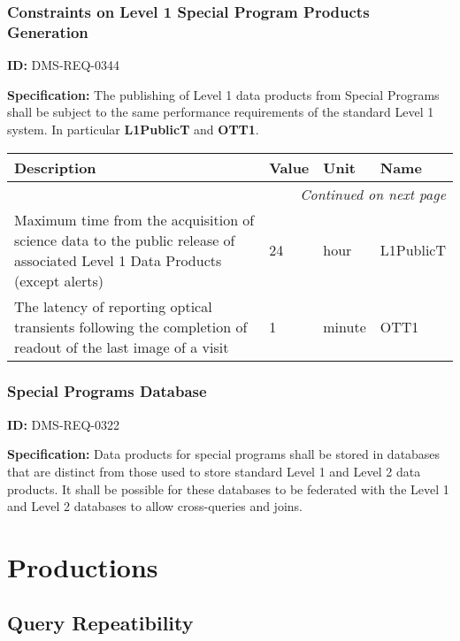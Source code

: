 \documentclass[SE,toc,lsstdraft]{lsstdoc}
\makeatletter
\newcommand{\paramname}[1]{\hspace{0pt}#1}
\newcommand{\unitname}[1]{\hspace{0pt}#1}
\newenvironment{parameters}[0]{%
\setlength\LTleft{0pt}
\setlength\LTright{\fill}
\begin{small}
\begin{longtable}[]{|p{0.5\textwidth}|l|p{0.6in}|p{1.74in}@{}|}

\hline \textbf{Description} & \textbf{Value} & \textbf{Unit} & \textbf{Name} \\ \hline
\endhead

\hline \multicolumn{4}{r}{\emph{Continued on next page}} \\
\endfoot

\hline\hline
\endlastfoot
}{%
\hline
\end{longtable}
\end{small}
}
\makeatother
\begin{document}
\subsubsection{Constraints on Level 1 Special Program Products Generation}

\label{DMS-REQ-0344}
\textbf{ID:} DMS-REQ-0344

\textbf{Specification: }The publishing of Level 1 data products from Special Programs shall be subject to the same performance requirements of the standard Level 1 system. In particular \textbf{L1PublicT} and \textbf{OTT1}.





\begin{parameters}
Maximum time from the acquisition of science data to the public release of associated Level 1 Data Products (except alerts)
&
24
&
\unitname{%
hour
}
&
\paramname{%
L1PublicT
} \\\hline
The latency of reporting optical transients following the completion of readout of the last image of a visit
&
1
&
\unitname{%
minute
}
&
\paramname{%
OTT1
} \\\hline
\end{parameters}




\subsubsection{Special Programs Database}

\label{DMS-REQ-0322}
\textbf{ID:} DMS-REQ-0322

\textbf{Specification:} Data products for special programs shall be stored in databases that are distinct from those used to store standard Level 1 and Level 2 data products. It shall be possible for these databases to be federated with the Level 1 and Level 2 databases to allow cross-queries and joins.







\section{Productions}





\subsection{Query Repeatibility}
\end{document}
